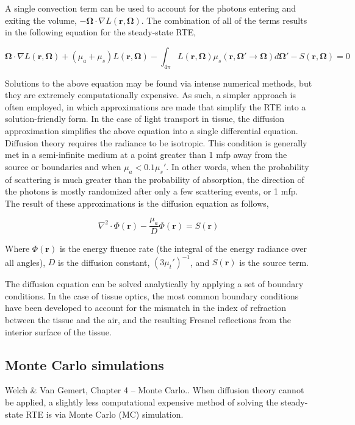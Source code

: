 A single convection term can be used to account for the photons entering and exiting the volume, $-\mathbf{\Omega}\cdot\nabla L(\mathbf{r},\mathbf{\Omega})$. The combination of all of the terms results in the following equation for the steady-state RTE,\cite{Farrell2003}

\begin{equation}
\label{eq:rte}
\mathbf{\Omega}\cdot\nabla L(\mathbf{r},\mathbf{\Omega}) + (\mu_a + \mu_s) L(\mathbf{r},\mathbf{\Omega}) - \int_{4\pi} L(\mathbf{r},\mathbf{\Omega}) \mu_s(\mathbf{r},\mathbf{\Omega}' \rightarrow \mathbf{\Omega}) d \mathbf{\Omega'} - S(\mathbf{r},\mathbf{\Omega}) = 0
\end{equation}

Solutions to the above equation may be found via intense numerical methods, but they are extremely computationally expensive. As such, a simpler approach is often employed, in which approximations are made that simplify the RTE into a solution-friendly form. In the case of light transport in tissue, the diffusion approximation simplifies the above equation into a single differential equation.
Diffusion theory requires the radiance to be isotropic. This condition is generally met in a semi-infinite medium at a point greater than 1 mfp away from the source or boundaries\cite{Jacques2004} and when $ \mu_a < 0.1\mu_s'$.\cite{Wilson2008} In other words, when the probability of scattering is much greater than the probability of absorption, the direction of the photons is mostly randomized after only a few scattering events, or 1 mfp. The result of these approximations is the diffusion equation as follows,

\begin{equation}
\label{eq:diffeq}
\nabla^2 \cdot \Phi(\mathbf{r}) - \frac{\mu_a}{D}\Phi(\mathbf{r}) = S(\mathbf{r})
\end{equation}

Where $\Phi(\mathbf{r})$ is the energy fluence rate (the integral of the energy radiance over all angles), $D$ is the diffusion constant, $(3\mu_t')^{-1}$, and $S(\mathbf{r})$ is the source term.

The diffusion equation can be solved analytically by applying a set of boundary conditions. In the case of tissue optics, the most common boundary conditions have been developed to account for the mismatch in the index of refraction between the tissue and the air, and the resulting Fresnel reflections from the interior surface of the tissue.

\subsection{Monte Carlo simulations}
Welch \& Van Gemert, Chapter 4 – Monte Carlo..
When diffusion theory cannot be applied, a slightly less computational expensive method of solving the steady-state RTE is via Monte Carlo (MC) simulation.

